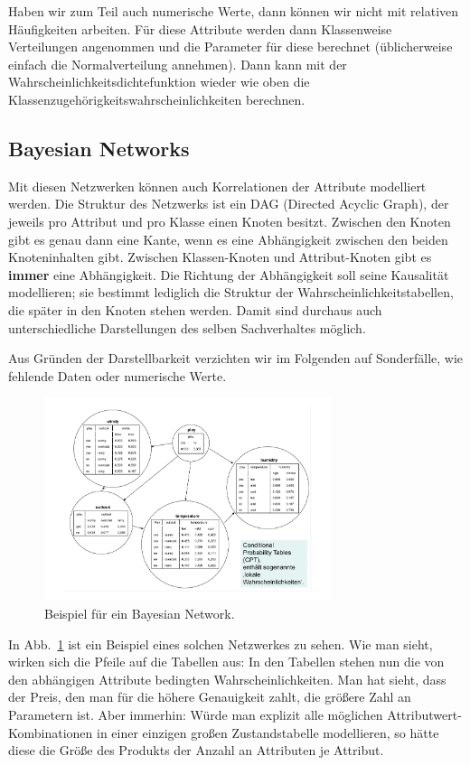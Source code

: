 Haben wir zum Teil auch numerische Werte, dann können wir nicht
mit relativen Häufigkeiten arbeiten. Für diese Attribute werden dann
Klassenweise Verteilungen angenommen und die Parameter für diese
berechnet (üblicherweise einfach die Normalverteilung annehmen).
Dann kann mit der Wahrscheinlichkeitsdichtefunktion wieder wie oben
die Klassenzugehörigkeitswahrscheinlichkeiten berechnen.

\subsection{Bayesian Networks}
Mit diesen Netzwerken können auch Korrelationen der Attribute
modelliert werden. Die Struktur des Netzwerks ist ein DAG (Directed Acyclic
Graph), der jeweils pro Attribut und pro Klasse einen Knoten besitzt.
Zwischen den Knoten gibt es genau dann eine Kante, wenn es eine Abhängigkeit
zwischen den beiden Knoteninhalten gibt. Zwischen Klassen-Knoten und
Attribut-Knoten gibt es \textbf{immer} eine Abhängigkeit. Die Richtung
der Abhängigkeit soll seine Kausalität modellieren; sie bestimmt lediglich
die Struktur der Wahrscheinlichkeitstabellen, die später in den Knoten
stehen werden. Damit sind durchaus auch unterschiedliche Darstellungen
des selben Sachverhaltes möglich.

Aus Gründen der Darstellbarkeit verzichten wir im Folgenden auf
Sonderfälle, wie fehlende Daten oder numerische Werte.

\begin{figure}[htbp]
	\centering
	\includegraphics[width=0.75\textwidth]{Figures/cpt}
	\caption[BN Beispiel]{Beispiel für ein Bayesian Network.\footnotemark}
	\label{fig:cpt}
\end{figure}

In Abb.~\ref{fig:cpt} ist ein Beispiel eines solchen Netzwerkes zu sehen.
Wie man sieht, wirken sich die Pfeile auf die Tabellen aus: In den
Tabellen stehen nun die von den abhängigen Attribute bedingten 
Wahrscheinlichkeiten. Man hat sieht, dass der Preis, den man für
die höhere Genauigkeit zahlt, die größere Zahl an Parametern ist.
Aber immerhin: Würde man explizit alle möglichen Attributwert-
Kombinationen in einer einzigen großen Zustandstabelle modellieren,
so hätte diese die Größe des Produkts der Anzahl an Attributen je
Attribut.


